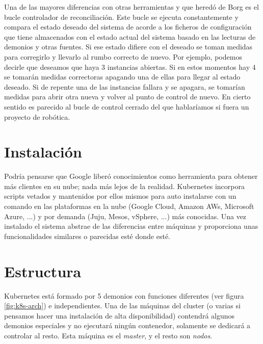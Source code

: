 Una de las mayores diferencias con otras herramientas y que heredó de Borg es el bucle controlador de reconciliación\cite{borgomegak8s}. Este bucle se ejecuta constantemente y compara el estado deseado del sistema de acorde a los ficheros de configuración que tiene almacenados con el estado actual del sistema basado en las lecturas de demonios y otras fuentes. Si ese estado difiere con el deseado se toman medidas para corregirlo y llevarlo al rumbo correcto de nuevo. Por ejemplo, podemos decirle que deseamos que haya 3 instancias abiertas. Si en estos momentos hay 4 se tomarán medidas correctoras apagando una de ellas para llegar al estado deseado. Si de repente una de las instancias fallara y se apagara, se tomarían medidas para abrir otra nueva y volver al punto de control de nuevo. En cierto sentido es parecido al bucle de control cerrado del que hablaríamos si fuera un proyecto de robótica.

\section{Instalación}
\label{sec:k8s-install}

Podría pensarse que Google liberó conocimientos como herramienta para obtener más clientes en su nube; nada más lejos de la realidad. Kubernetes incorpora scripts\cite{clusterscripts} vetados y mantenidos por ellos mismos para auto instalarse con un comando en las plataformas en la nube (Google Cloud, Amazon AWs, Microsoft Azure, ...) y por demanda (Juju, Mesos, vSphere, ...) más conocidas. Una vez instalado el sistema abstrae de las diferencias entre máquinas y proporciona unas funcionalidades similares o parecidas esté donde esté.

\section{Estructura}
\label{sec:k8s-estructura}

Kubernetes está formado por 5 demonios con funciones diferentes (ver figura \ref{fig:k8s-arch}) e independientes\cite{k8sdesignarch}. Una de las máquinas del cluster (o varias si pensamos hacer una instalación de alta disponibilidad) contendrá algunos demonios especiales y no ejecutará ningún contenedor, solamente se dedicará a controlar al resto. Esta máquina es el \emph{master}, y el resto son \emph{nodos}.

